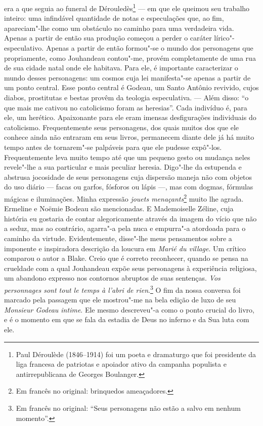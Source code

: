 era a que seguia ao funeral de Dérouledès\footnote{Paul Déroulède
  (1846--1914) foi um poeta e dramaturgo que foi presidente da liga
  francesa de patriotas e apoiador ativo da campanha populista e
  antirrepublicana de Georges Boulanger. \versal{[N.~O.]}} --- em que ele queimou seu
trabalho inteiro: uma infindável quantidade de notas e especulações que,
ao fim, apareciam"-lhe como um obstáculo no caminho para uma verdadeira
vida. Apenas a partir de então sua produção começou a perder o caráter
lírico"-especulativo. Apenas a partir de então formou"-se o mundo dos
personagens que propriamente, como Jouhandeau contou"-me, provém
completamente de uma rua de sua cidade natal onde ele habitava. Para
ele, é importante caracterizar o mundo desses personagens: um cosmos
cuja lei manifesta"-se apenas a partir de um ponto central. Esse ponto
central é Godeau, um Santo Antônio revivido, cujos diabos, prostitutas e
bestas provêm da teologia especulativa. --- Além disso: ``o que mais me
cativou no catolicismo foram as heresias''. Cada indivíduo é, para ele,
um herético. Apaixonante para ele eram imensas desfigurações individuais
do catolicismo. Frequentemente seus personagens, dos quais muitos dos
que ele conhece ainda não entraram em seus livros, permanecem diante
dele já há muito tempo antes de tornarem"-se palpáveis para que ele
pudesse expô"-los. Frequentemente leva muito tempo até que um pequeno
gesto ou mudança neles revele"-lhe a sua particular e mais peculiar
heresia. Digo"-lhe da estupenda e abstrusa jocosidade de seus personagens
cuja dispersão maneja não com objetos do uso diário --- facas ou garfos,
fósforos ou lápis ---, mas com dogmas, fórmulas mágicas e iluminações.
Minha expressão \emph{jouets menaçants}\footnote{Em francês no original: brinquedos
  ameaçadores. \versal{[N.~T.]}} muito lhe agrada. Ermeline e
Noëmie Bodeau são mencionadas. E Mademoiselle Zéline, cuja história eu
gostaria de contar alegoricamente através da imagem do vício que não a
seduz, mas ao contrário, agarra"-a pela nuca e empurra"-a atordoada para o
caminho da virtude. Evidentemente, disse"-lhe meus pensamentos sobre a
imponente e inspiradora descrição da loucura em \emph{Marié du village}.
Um crítico comparou o autor a Blake. Creio que é correto reconhecer,
quando se pensa na crueldade com a qual Jouhandeau expõe seus
personagens à experiência religiosa, um abandono expresso nos contornos
abruptos de suas sentenças. \emph{Vos personnages sont tout le temps à
l'abri de rien}.\footnote{Em francês no original: ``Seus personagens não estão a salvo em
  nenhum momento''. \versal{[N.~T.]}} O fim da nossa conversa
foi marcado pela passagem que ele mostrou"-me na bela edição de luxo de
seu \emph{Monsieur Godeau intime}. Ele mesmo descreveu"-a como o ponto
crucial do livro, e é o momento em que se fala da estadia de Deus no
inferno e da Sua luta com ele.

